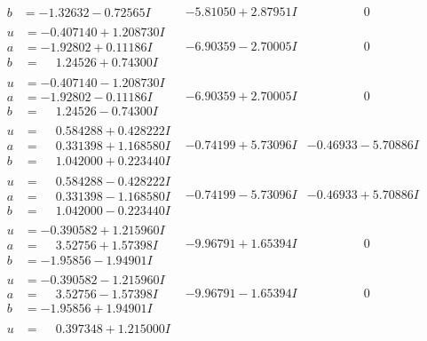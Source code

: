 \documentclass[1p]{elsarticle_modified}
\theoremstyle{definition}
\begin{document}
$$\begin{array}{c|c|c}
\begin{aligned}
b &= -1.32632 - 0.72565 I\end{aligned}
 & -5.81050 + 2.87951 I & \phantom{-0.000000 } 0 \\ \hline\begin{aligned}
u &= -0.407140 + 1.208730 I \\
a &= -1.92802 + 0.11186 I \\
b &= \phantom{-}1.24526 + 0.74300 I\end{aligned}
 & -6.90359 - 2.70005 I & \phantom{-0.000000 } 0 \\ \hline\begin{aligned}
u &= -0.407140 - 1.208730 I \\
a &= -1.92802 - 0.11186 I \\
b &= \phantom{-}1.24526 - 0.74300 I\end{aligned}
 & -6.90359 + 2.70005 I & \phantom{-0.000000 } 0 \\ \hline\begin{aligned}
u &= \phantom{-}0.584288 + 0.428222 I \\
a &= \phantom{-}0.331398 + 1.168580 I \\
b &= \phantom{-}1.042000 + 0.223440 I\end{aligned}
 & -0.74199 + 5.73096 I & -0.46933 - 5.70886 I \\ \hline\begin{aligned}
u &= \phantom{-}0.584288 - 0.428222 I \\
a &= \phantom{-}0.331398 - 1.168580 I \\
b &= \phantom{-}1.042000 - 0.223440 I\end{aligned}
 & -0.74199 - 5.73096 I & -0.46933 + 5.70886 I \\ \hline\begin{aligned}
u &= -0.390582 + 1.215960 I \\
a &= \phantom{-}3.52756 + 1.57398 I \\
b &= -1.95856 - 1.94901 I\end{aligned}
 & -9.96791 + 1.65394 I & \phantom{-0.000000 } 0 \\ \hline\begin{aligned}
u &= -0.390582 - 1.215960 I \\
a &= \phantom{-}3.52756 - 1.57398 I \\
b &= -1.95856 + 1.94901 I\end{aligned}
 & -9.96791 - 1.65394 I & \phantom{-0.000000 } 0 \\ \hline\begin{aligned}
u &= \phantom{-}0.397348 + 1.215000 I \\

\end{aligned}
\end{array}$$
\end{document}
